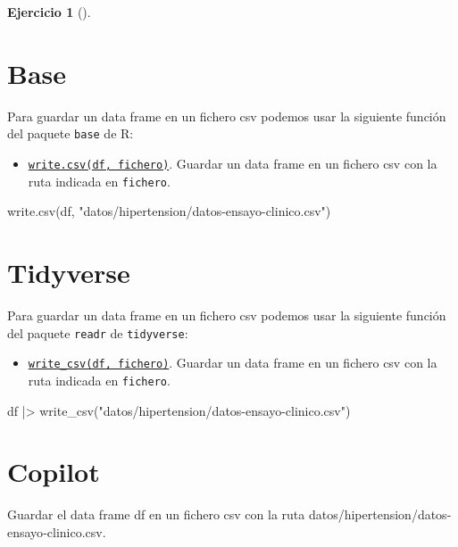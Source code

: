 \documentclass[
  a4paper,
]{scrreport}
\newenvironment{Shaded}{\begin{snugshade}}{\end{snugshade}}
\newcommand{\ExtensionTok}[1]{\textcolor[rgb]{0.00,0.23,0.31}{#1}}
\newcommand{\FunctionTok}[1]{\textcolor[rgb]{0.28,0.35,0.67}{#1}}
\newcommand{\NormalTok}[1]{\textcolor[rgb]{0.00,0.23,0.31}{#1}}
\newcommand{\SpecialCharTok}[1]{\textcolor[rgb]{0.37,0.37,0.37}{#1}}
\newcommand{\StringTok}[1]{\textcolor[rgb]{0.13,0.47,0.30}{#1}}
\providecommand{\tightlist}{%
  \setlength{\itemsep}{0pt}\setlength{\parskip}{0pt}}\usepackage{longtable,booktabs,array}
\theoremstyle{definition}
\newtheorem{exercise}{Ejercicio}[chapter]
\theoremstyle{remark}
\begin{document}
\begin{exercise}[]
\begin{enumerate}
\begin{tcolorbox}
  \section{Base}

  Para guardar un data frame en un fichero csv podemos usar la siguiente
  función del paquete \texttt{base} de R:

  \begin{itemize}
  \tightlist
  \item
    \href{https://rdrr.io/rforge/tldutils/man/write_csv.html}{\texttt{write.csv(df,\ fichero)}}.
    Guardar un data frame en un fichero csv con la ruta indicada en
    \texttt{fichero}.
  \end{itemize}

\begin{Shaded}
\begin{Highlighting}[]
\FunctionTok{write.csv}\NormalTok{(df, }\StringTok{"datos/hipertension/datos{-}ensayo{-}clinico.csv"}\NormalTok{)}
\end{Highlighting}
\end{Shaded}

  \section{Tidyverse}

  Para guardar un data frame en un fichero csv podemos usar la siguiente
  función del paquete \texttt{readr} de \texttt{tidyverse}:

  \begin{itemize}
  \tightlist
  \item
    \href{https://readr.tidyverse.org/reference/write_csv.html}{\texttt{write\_csv(df,\ fichero)}}.
    Guardar un data frame en un fichero csv con la ruta indicada en
    \texttt{fichero}.
  \end{itemize}

\begin{Shaded}
\begin{Highlighting}[]
\NormalTok{df  }\SpecialCharTok{|\textgreater{}} \FunctionTok{write\_csv}\NormalTok{(}\StringTok{"datos/hipertension/datos{-}ensayo{-}clinico.csv"}\NormalTok{)}
\end{Highlighting}
\end{Shaded}

  \section{Copilot}

\begin{Shaded}
\begin{Highlighting}[]
\ExtensionTok{Guardar}\NormalTok{ el data frame df en un fichero csv con la ruta datos/hipertension/datos{-}ensayo{-}clinico.csv.}
\end{Highlighting}
\end{Shaded}

  \end{tcolorbox}
\end{enumerate}

\end{exercise}
\end{document}
